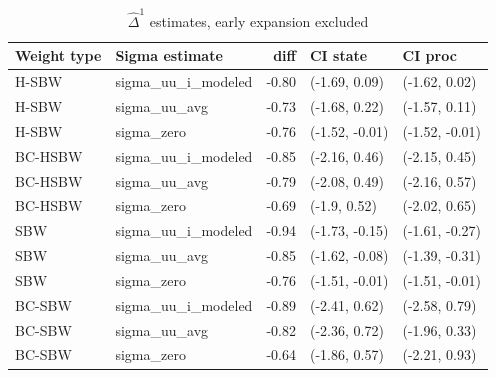 \begin{table}[ht]
\centering
\caption{$\hat{\Delta}^1$ estimates, early expansion excluded}
\label{tab:deltac2}
\begin{tabular}{llrll}
  \toprule
Weight type & Sigma estimate & diff & CI state & CI proc \\ 
  \midrule
H-SBW & sigma\_uu\_i\_modeled & -0.80 & (-1.69, 0.09) & (-1.62, 0.02) \\ 
  H-SBW & sigma\_uu\_avg & -0.73 & (-1.68, 0.22) & (-1.57, 0.11) \\ 
  H-SBW & sigma\_zero & -0.76 & (-1.52, -0.01) & (-1.52, -0.01) \\ 
  BC-HSBW & sigma\_uu\_i\_modeled & -0.85 & (-2.16, 0.46) & (-2.15, 0.45) \\
  BC-HSBW & sigma\_uu\_avg & -0.79 & (-2.08, 0.49) & (-2.16, 0.57) \\ 
  BC-HSBW & sigma\_zero & -0.69 & (-1.9, 0.52) & (-2.02, 0.65) \\ 
  SBW & sigma\_uu\_i\_modeled & -0.94 & (-1.73, -0.15) & (-1.61, -0.27) \\ 
  SBW & sigma\_uu\_avg & -0.85 & (-1.62, -0.08) & (-1.39, -0.31) \\ 
  SBW & sigma\_zero & -0.76 & (-1.51, -0.01) & (-1.51, -0.01) \\ 
  BC-SBW & sigma\_uu\_i\_modeled & -0.89 & (-2.41, 0.62) & (-2.58, 0.79) \\ 
  BC-SBW & sigma\_uu\_avg & -0.82 & (-2.36, 0.72) & (-1.96, 0.33) \\ 
  BC-SBW & sigma\_zero & -0.64 & (-1.86, 0.57) & (-2.21, 0.93) \\ 
   \bottomrule
\end{tabular}
\end{table}

